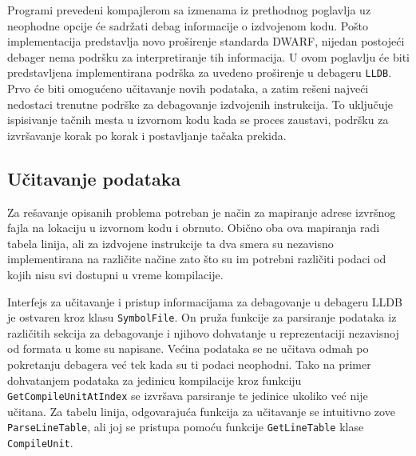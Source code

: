 \documentclass[12pt,oneside]{memoir}
\begin{document}
Programi prevedeni kompajlerom sa izmenama iz prethodnog poglavlja uz neophodne opcije će sadržati debag informacije o izdvojenom kodu.
Pošto implementacija predstavlja novo proširenje standarda DWARF, nijedan postojeći debager nema podršku za interpretiranje tih informacija.
U ovom poglavlju će biti predstavljena implementirana podrška za uvedeno proširenje u debageru \verb|LLDB|.
Prvo će biti omogućeno učitavanje novih podataka, a zatim rešeni najveći nedostaci trenutne podrške za debagovanje izdvojenih instrukcija.
To uključuje ispisivanje tačnih mesta u izvornom kodu kada se proces zaustavi, podršku za izvršavanje korak po korak i postavljanje tačaka prekida.


\subsection{Učitavanje podataka}

\label{sec:debugger_loading}

Za rešavanje opisanih problema potreban je način za mapiranje adrese izvršnog fajla na lokaciju u izvornom kodu i obrnuto.
Obično oba ova mapiranja radi tabela linija, ali za izdvojene instrukcije ta dva smera su nezavisno implementirana na različite načine zato što su im potrebni različiti podaci od kojih nisu svi dostupni u vreme kompilacije.

Interfejs za učitavanje i pristup informacijama za debagovanje u debageru LLDB je ostvaren kroz klasu \verb|SymbolFile|.
On pruža funkcije za parsiranje podataka iz različitih sekcija za debagovanje i njihovo dohvatanje u reprezentaciji nezavisnoj od formata u kome su napisane.
Većina podataka se ne učitava odmah po pokretanju debagera već tek kada su ti podaci neophodni.
Tako na primer dohvatanjem podataka za jedinicu kompilacije kroz funkciju \verb|GetCompileUnitAtIndex| se izvršava parsiranje te jedinice ukoliko već nije učitana.
Za tabelu linija, odgovarajuća funkcija za učitavanje se intuitivno zove \verb|ParseLineTable|, ali joj se pristupa pomoću funkcije \verb|GetLineTable| klase \verb|CompileUnit|.
\end{document}

